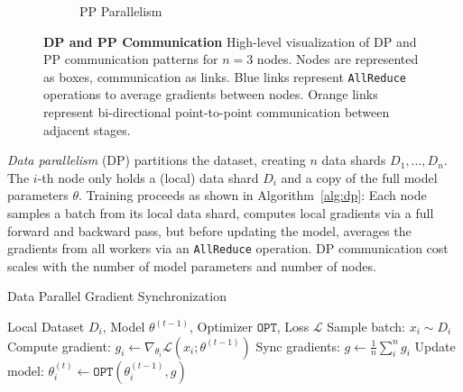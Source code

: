 \documentclass{article}
\begin{document}
\begin{figure}[h]
\begin{subfigure}[b]{0.22\textwidth}
        \caption{PP Parallelism}
    \end{subfigure}
    \caption{\textbf{DP and PP Communication} High-level visualization of DP and
    PP communication patterns for $n=3$ nodes. Nodes are represented as boxes,
    communication as links. {\color{bblue} Blue links} represent
    \texttt{AllReduce} operations to average gradients between nodes. 
    {\color{oorange}Orange links} represent bi-directional point-to-point
    communication between adjacent stages.}
    \label{fig:dp-pp}
\end{figure}

\textit{Data parallelism} (DP) partitions the dataset, creating $n$ data shards
$D_1,\dots,D_n$. The $i$-th node only holds a (local) data shard $D_i$ and a
copy of the full model parameters $\theta$. Training proceeds as shown in
Algorithm~\ref{alg:dp}: Each node samples a batch from its local data shard,
computes local gradients via a full forward and backward pass, but before
updating the model, averages the gradients from all workers via an
\texttt{AllReduce} operation. DP communication cost scales with the number of
model parameters and number of nodes.

\begin{algorithm}
\caption{Data Parallel Gradient Synchronization}
\label{alg:dp}
\begin{algorithmic}
 Local Dataset $D_i$, Model $\theta^{(t-1)}$, Optimizer $\mathtt{OPT}$, Loss $\mathcal{L}$
\STATE Sample batch: $x_i\sim D_i$
\STATE Compute gradient: $g_i \gets \nabla_{\theta_i} \mathcal{L}(x_i; \theta^{(t-1)})$
\STATE Sync gradients: $g \gets \frac{1}{n}\sum_{i}^n g_i$ 
\STATE Update model: $\theta_i^{(t)} \gets \mathtt{OPT}(\theta_i^{(t-1)}, g)$
\end{algorithmic}
\end{algorithm}
\end{document}
